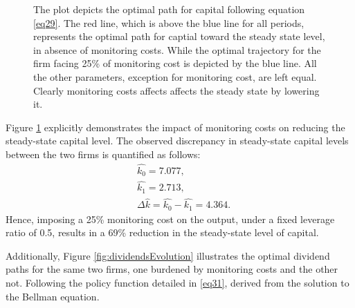 \documentclass[12pt]{report}
\begin{document}
\begin{figure}[H]
    \centering
    \caption{The plot depicts the optimal path for capital following equation \ref{eq29}. The red line, which is above
    the blue line for all periods, represents the optimal path for captial toward the steady state level, in absence of
    monitoring costs. While the optimal trajectory for the firm facing 25\% of monitoring cost is depicted by the blue
    line. All the other parameters, exception for monitoring cost, are left equal. Clearly monitoring costs affects
    affects the steady state by lowering it.}
    \label{fig:capitalEvolution}
\end{figure}
Figure \ref{fig:capitalEvolution} explicitly demonstrates the impact of monitoring costs on reducing the steady-state capital level. The observed discrepancy in steady-state capital levels between the two firms is quantified as follows:
\begin{align*}
    &\hat{k_0} = 7.077, \\
    &\hat{k_1} = 2.713, \\
    &\Delta\hat{k} = \hat{k_0} - \hat{k_1} = 4.364.
\end{align*}
Hence, imposing a 25\% monitoring cost on the output, under a fixed leverage ratio of 0.5, results in a 69\% reduction in the steady-state level of capital.

Additionally, Figure \ref{fig:dividendsEvolution} illustrates the optimal dividend paths for the same two firms, one burdened by monitoring costs and the other not. Following the policy function detailed in \autoref{eq31}, derived from the solution to the Bellman equation.
\end{document}
